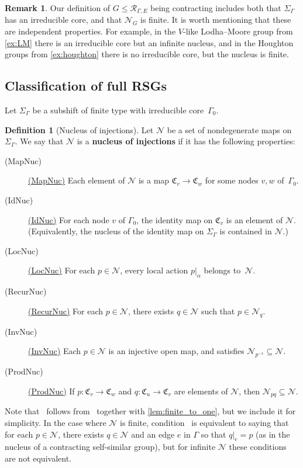 \documentclass[11pt,letterpaper]{amsart}
\theoremstyle{definition}
\newtheorem{definition}[theorem]{Definition}
\newtheorem{remark}[theorem]{Remark}
\newcommand{\newword}[1]{\textbf{#1}}
\newcommand{\R}{\mathcal{R}}
\newcommand{\Nuc}{\mathcal{N}}
\newcommand{\C}{\mathfrak{C}}
\newcommand{\listlabel}[1]{%
  \item[\quad(#1)]\hypertarget{#1}{}\global\expandafter\def\csname #1\endcsname{\hyperlink{#1}{(#1)}}}
\begin{document}
\begin{remark}
Our definition of $G\le \R_{\Gamma,E}$ being contracting includes both that $\Sigma_\Gamma$ has an irreducible core, and that $\Nuc_G$ is finite. It is worth mentioning that these are independent properties. For example, in the $V$-like Lodha--Moore group from \cref{ex:LM} there is an irreducible core but an infinite nucleus, and in the Houghton groups from \cref{ex:houghton} there is no irreducible core, but the nucleus is finite.
\end{remark}


\subsection{Classification of full RSGs}\label{ssec:construct_groups}

Let $\Sigma_\Gamma$ be a subshift of finite type with irreducible core~$\Gamma_0$.

\begin{definition}[Nucleus of injections]
Let $\Nuc$ be a set of nondegenerate maps on $\Sigma_\Gamma$.  We say that $\Nuc$ is a \newword{nucleus of injections} if it has the following properties:
\begin{description}

\listlabel{MapNuc} Each element of $\Nuc$ is a map $\C_v\to \C_w$ for some nodes $v,w$ of~$\Gamma_0$.\smallskip

\listlabel{IdNuc} For each node $v$ of $\Gamma_0$, the identity map on $\C_v$ is an element of $\Nuc$. (Equivalently, the nucleus of the identity map on $\Sigma_\Gamma$ is contained in $\Nuc$.)\smallskip

\listlabel{LocNuc}
For each $p\in\Nuc$, every local action $p|_\alpha$ belongs to~$\Nuc$.\smallskip

\listlabel{RecurNuc}
For each $p\in\Nuc$, there exists $q\in \Nuc$ such that $p\in \Nuc_q$.\smallskip

\listlabel{InvNuc}
Each $p\in\Nuc$ is an injective open map, and satisfies $\Nuc_{p^{-1}}\subseteq \Nuc$.\smallskip

\listlabel{ProdNuc}
If $p\colon \C_v\to \C_w$ and $q\colon \C_u\to \C_v$ are elements of $\Nuc$, then $\Nuc_{pq}\subseteq \Nuc$.
\end{description}
\end{definition}

Note that \MapNuc\ follows from \RecurNuc\ together with \cref{lem:finite_to_one}, but we include it for simplicity.  In the case where $\Nuc$ is finite, condition \RecurNuc\ is equivalent to saying that for each $p\in\Nuc$, there exists $q\in\Nuc$ and an edge $e$ in $\Gamma$ so that $q|_e=p$ (as in the nucleus of a contracting self-similar group), but for infinite $\Nuc$ these conditions are not equivalent.
\end{document}

